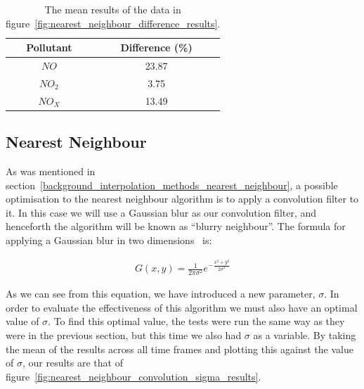 			\begin{table}
				\centering
	    		\begin{tabular}{|c|c|}
	    			\hline
			        Pollutant & Difference (\%) \\ \hline
					$NO$ & 23.87 \\
					$NO_{2}$ & 3.75 \\
					$NO_{X}$ & 13.49 \\ \hline
				\end{tabular}
				\caption{The mean results of the data in figure~\ref{fig:nearest_neighbour_difference_results}.}
				\label{tab:nearest_neighbour_difference_results_mean}
			\end{table}

		\subsection{Nearest Neighbour}\label{prediction_evaluation_results_nearest_neighbour_convolution_filter}


			As was mentioned in section~\ref{background_interpolation_methods_nearest_neighbour}, a possible optimisation to the nearest neighbour algorithm is to apply a convolution filter to it. In this case we will use a Gaussian blur as our convolution filter, and henceforth the algorithm will be known as ``blurry neighbour''. The formula for applying a Gaussian blur in two dimensions~\cite{gaussianblur} is:

			\begin{align*}
				G(x,y) = \frac{1}{2\pi\sigma^{2}} e^{-\frac{x^{2} + y^{2}}{2\sigma^{2}}}
			\end{align*}

			As we can see from this equation, we have introduced a new parameter, $\sigma$. In order to evaluate the effectiveness of this algorithm we must also have an optimal value of $\sigma$. To find this optimal value, the tests were run the same way as they were in the previous section, but this time we also had $\sigma$ as a variable. By taking the mean of the results across all time frames and plotting this against the value of $\sigma$, our results are that of figure~\ref{fig:nearest_neighbour_convolution_sigma_results}. 

